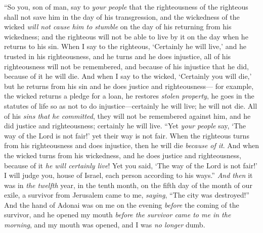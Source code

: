 \begin{biblechapter}
\verse “So you, son of man, say to \textit{your people} that the righteousness of the righteous shall not save him in the day of his transgression, and the wickedness of the wicked \textit{will not cause him to stumble} on the day of his returning from his wickedness; and the righteous will not be able to live by it on the day when he returns to his sin.
\verse When I say to the righteous, ‘Certainly he will live,’ and he trusted in his righteousness, and he turns and he does injustice, all of his righteousness will not be remembered, and because of his injustice that he did, because of it he will die.
\verse And when I say to the wicked, ‘Certainly you will die,’ but he returns from his sin and he does justice and righteousness—
\verse for example, the wicked returns a pledge for a loan, he restores \textit{stolen property}, he goes in the statutes of life so as not to do injustice—certainly he will live; he will not die.
\verse All of his \textit{sins that he committed}, they will not be remembered against him, and he did justice and righteousness; certainly he will live.
\verse “Yet \textit{your people} say, ‘The way of the Lord is not fair!’ yet their way is not fair.
\verse When the righteous turns from his righteousness and does injustice, then he will die \textit{because of it}.
\verse And when the wicked turns from his wickedness, and he does justice and righteousness, because of it \textit{he will certainly live}!
\verse Yet you said, ‘The way of the Lord is not fair!’ I will judge you, house of Israel, each person according to his ways.”
\verse \textit{And then} it was in \textit{the twelfth} year, in the tenth month, on the fifth day of the month of our exile, a survivor from Jerusalem came to me, \textit{saying}, “The city was destroyed!”
\verse And the hand of Adonai was on me on the evening \textit{before} the coming of the survivor, and he opened my mouth \textit{before the survivor came to me in the morning}, and my mouth was opened, and I was \textit{no longer} dumb.

\end{biblechapter}
